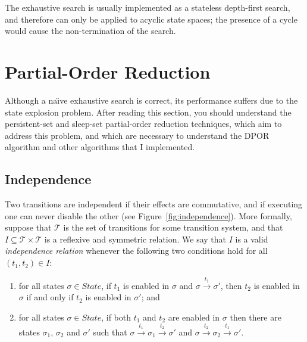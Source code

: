 \documentclass[12pt,a4paper,twoside,openany]{report}
\begin{document}
The exhaustive search is usually
implemented as a stateless depth-first search,
and therefore can only be applied to acyclic state spaces;
the presence of a cycle would cause the non-termination
of the search.

\section{Partial-Order Reduction}

Although a na\"{\i}ve exhaustive search
is correct, its performance suffers due to
the state explosion problem.
After reading this section, you should
understand the persistent-set and sleep-set
partial-order reduction techniques, which
aim to address this problem, and which
are necessary to understand the DPOR
algorithm and other algorithms that I
implemented.

\subsection{Independence} \label{sec:independence}
Two transitions are independent if their
effects are commutative, and if executing one
can never disable the other (see Figure~\ref{fig:independence}).
More formally, suppose that $\mathcal{T}$ is the set of
transitions for some transition system, and
that $I \subseteq \mathcal{T} \times \mathcal{T}$
is a reflexive and symmetric relation. We say
that $I$ is a valid \emph{independence relation}
whenever the following two conditions hold for
all $(t_1, t_2) \in I$:
\begin{enumerate}
	\item for all states $\sigma \in \textit{State}$,
		if $t_1$ is enabled in $\sigma$ and
		$\sigma \xrightarrow{t_1} \sigma'$, then
		$t_2$ is enabled in $\sigma$ if and only if
		$t_2$ is enabled in $\sigma'$; and
	\item for all states $\sigma \in \textit{State}$,
		if both $t_1$ and $t_2$ are enabled in $\sigma$
		then there are states $\sigma_1$, $\sigma_2$ and
		$\sigma'$ such that
		$\sigma \xrightarrow{t_1} \sigma_1 \xrightarrow{t_2} \sigma'$
		and
		$\sigma \xrightarrow{t_2} \sigma_2 \xrightarrow{t_1} \sigma'$.
\end{enumerate}
\end{document}
